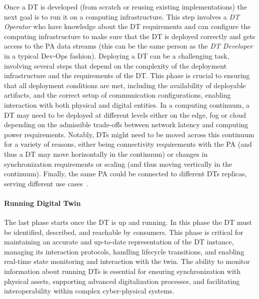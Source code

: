 Once a DT is developed (from scratch or reusing existing implementations) the next goal is to run it on a computing infrastructure.
This step involves a \emph{DT Operator} who have knowledge about the \ac{DT} requirements and can configure the computing infrastructure to make sure that the DT is deployed correctly and gets access to the \ac{PA} data streams (this can be the same person as the \emph{DT Developer} in a typical Dev-Ops fashion).
%
Deploying a DT can be a challenging task, involving several steps that depend on the complexity of the deployment infrastructure and the requirements of the DT.
%
This phase is crucial to ensuring that all deployment conditions are met, including 
the availability of deployable artifacts, and the correct setup of communication configurations, enabling interaction with both physical and digital entities.
%
In a computing continuum, a DT may need to be deployed at different levels either on the edge, fog or cloud depending on the admissible trade-offs between network latency and computing power requirements. Notably, \acp{DT} might need to be moved across this continuum for a variety of reasons, either being connectivity requirements with the \ac{PA} (and thus a DT may move horizontally in the continuum) or changes in synchronization requirements or scaling (and thus moving vertically in the continuum). Finally, the same \ac{PA} could be connected to different \acp{DT} replicas, serving different use cases~\cite{dt-IoT-context-Minerva-2020}.

\paragraph{Running Digital Twin}

The last phase starts once the \ac{DT} is up and running. In this phase the DT must be identified, described, and reachable by consumers.
%
This phase is critical for maintaining an accurate and up-to-date representation of the DT instance, managing its interaction protocols, handling lifecycle transitions, and enabling real-time state monitoring and interaction with the twin.
%
The ability to monitor information about running \acp{DT} is essential for ensuring synchronization with physical assets, supporting advanced digitalization processes, and facilitating interoperability within complex cyber-physical systems.


